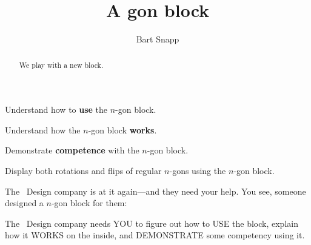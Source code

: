 \documentclass[noauthor,nooutcomes,12pt]{ximera}
\title{A gon block}
\author{Bart Snapp}
\begin{document}
\begin{abstract}
  We play with a new block.
\end{abstract}
\maketitle

\begin{listOutcomes}
\item Understand how to \textbf{use} the $n$-gon block.
\item Understand how the $n$-gon block \textbf{works}.
\item Demonstrate \textbf{competence} with the $n$-gon block.
\item Display both rotations and flips of regular $n$-gons using the
  $n$-gon block.
\end{listOutcomes}



The \mooculus\ Design company is at it again---and they need your
help. You see, someone designed a $n$-gon block for them:

The \mooculus\ Design company needs YOU to figure out how to USE the
block, explain how it WORKS on the inside, and DEMONSTRATE some
competency using it. 
\mynewpage
\end{document}
